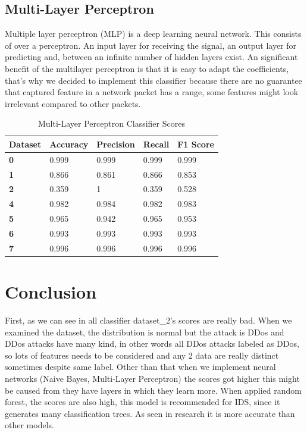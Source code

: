 \documentclass[submission,copyright,creativecommons]{eptcs}
\begin{document}
\subsection{Multi-Layer Perceptron}
Multiple layer perceptron (MLP) is a deep learning neural network. This consists of over a perceptron. An input layer for receiving the signal, an output layer for predicting and, between an infinite number of hidden layers exist. An significant benefit of the multilayer perceptron is that it is easy to adapt the coefficients, that's why we decided to implement this classifier because there are no guarantee that captured feature in a network packet has a range, some features might look irrelevant compared to other packets.\cite{b4}
\begin{table}[H]
\begin{center}
\begin{tabular}{|l|l|l|l|l|}
\hline
\textbf{Dataset} & \textbf{Accuracy} & \textbf{Precision} & \textbf{Recall} & \textbf{F1 Score} \\ \hline
\textbf{0}       & 0.999             & 0.999              & 0.999           & 0.999             \\ \hline
\textbf{1}       & 0.866             & 0.861              & 0.866           & 0.853             \\ \hline
\textbf{2}       & 0.359             & 1                  & 0.359           & 0.528             \\ \hline
\textbf{4}       & 0.982             & 0.984              & 0.982           & 0.983             \\ \hline
\textbf{5}       & 0.965             & 0.942              & 0.965           & 0.953             \\ \hline
\textbf{6}       & 0.993             & 0.993              & 0.993           & 0.993             \\ \hline
\textbf{7}       & 0.996             & 0.996              & 0.996           & 0.996             \\ \hline
\end{tabular}
\caption{Multi-Layer Perceptron Classifier Scores}
\label{tab:my-table}
\end{center}
\end{table}

\section{Conclusion}
First, as we can see in all classifier dataset\_2's scores are really bad. When we examined the dataset, the distribution is normal but the attack is DDos and DDos attacks have many kind, in other words all DDos attacks labeled as DDos, so lots of features needs to be considered and any 2 data are really distinct sometimes despite same label.
Other than that when we implement neural networks (Naive Bayes, Multi-Layer Perceptron) the scores got higher this might be caused from they have layers in which they learn more.
When applied random forest, the scores are also high, this model is recommended for IDS, since it generates many classification trees. As seen in research \cite{b3} it is more accurate than other models.
\end{document}
